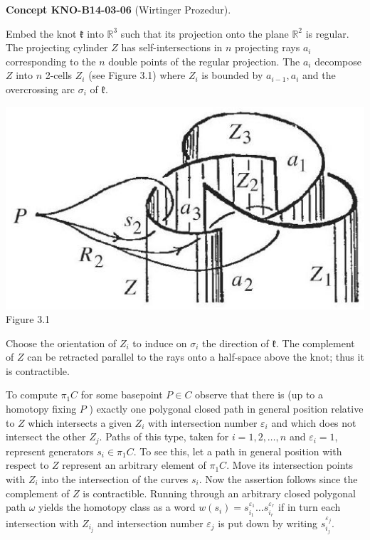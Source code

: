 \documentclass[10pt, letterpaper]{article}
\newcommand{\CustomHeading}[3]{%
  \par\medskip\noindent%
  \textbf{#1 #2} \textnormal{(#3)}.\enskip%
}
\newenvironment{CONC}[2]{\begin{unitbox}\CustomHeading{Concept}{#1}{#2}}{\end{unitbox}}
\begin{document}
\begin{CONC}{KNO-B14-03-06}{Wirtinger Prozedur}
Embed the knot $\mathfrak{k}$ into $\mathbb{R}^{3}$ such that its projection onto the plane $\mathbb{R}^{2}$ is regular. The projecting cylinder $Z$ has self-intersections in $n$ projecting rays $a_{i}$ corresponding to the $n$ double points of the regular projection. The $a_{i}$ decompose $Z$ into $n$ 2-cells $Z_{i}$ (see Figure 3.1) where $Z_{i}$ is bounded by $a_{i-1}, a_{i}$ and the overcrossing arc $\sigma_{i}$ of $\mathfrak{k}$.

\includegraphics[scale=0.2, center]{2025_05_21_9c06be8de7a55410f8c1g-046}
Figure 3.1

Choose the orientation of $Z_{i}$ to induce on $\sigma_{i}$ the direction of $\mathfrak{k}$. The complement of $Z$ can be retracted parallel to the rays onto a half-space above the knot; thus it is contractible.

To compute $\pi_{1} C$ for some basepoint $P \in C$ observe that there is (up to a homotopy fixing $P$ ) exactly one polygonal closed path in general position relative to $Z$ which intersects a given $Z_{i}$ with intersection number $\varepsilon_{i}$ and which does not intersect the other $Z_{j}$. Paths of this type, taken for $i=1,2, \ldots, n$ and $\varepsilon_{i}=1$, represent generators $s_{i} \in \pi_{1} C$. To see this, let a path in general position with respect to $Z$ represent an arbitrary element of $\pi_{1} C$. Move its intersection points with $Z_{i}$ into the intersection of the curves $s_{i}$. Now the assertion follows since the complement of $Z$ is contractible. Running through an arbitrary closed polygonal path $\omega$ yields the homotopy class as a word $w\left(s_{i}\right)=s_{i_{1}}^{\varepsilon_{1}} \ldots s_{i_{r}}^{\varepsilon_{r}}$ if in turn each intersection with $Z_{i_{j}}$ and intersection number $\varepsilon_{j}$ is put down by writing $s_{i_{j}}^{\varepsilon_{j}}$.


\end{CONC}
\end{document}
